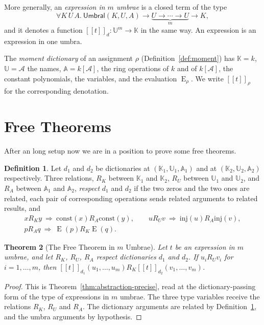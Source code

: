 \documentclass[11pt,a4paper]{report}
\theoremstyle{plain}
\newtheorem{theorem}{Theorem}[chapter]
\theoremstyle{definition}
\newtheorem{definition}[theorem]{Definition}
\theoremstyle{remark}
\newcommand{\E}{\operatorname{E}}
\newcommand{\Umbral}{\mathsf{Umbral}}
\newcommand{\sK}{\mathbb{K}}
\newcommand{\sU}{\mathbb{U}}
\newcommand{\sA}{\mathbb{A}}
\newcommand{\den}[2]{[\![#1]\!]_{#2}}
\begin{document}
More generally, an \emph{expression in $m$ umbrae} is a closed term of the type
\[
  \forall K\,U\,A.\ \Umbral(K, U, A) \to
    \underbrace{U \to \cdots \to U}_{m} \to K ,
\]
and it denotes a function $\den{t}{d} : \sU^m \to \sK$ in the same way. An
expression is an expression in one umbra.

The \emph{moment dictionary} of an assignment $\rho$
(Definition~\ref{def:moment}) has $\sK = k$, $\sU = \mathcal{A}$ the names,
$\sA = k[\mathcal{A}]$, the ring operations of $k$ and of $k[\mathcal{A}]$, the
constant polynomials, the variables, and the evaluation $\E_\rho$. We write
$\den{t}{\rho}$ for the corresponding denotation.

\section{Free Theorems}
\label{sec:free}

After an long setup now we are in a position to prove some free theorems.

\begin{definition}
\label{def:respects}
Let $d_1$ and $d_2$ be dictionaries at $(\sK_1, \sU_1, \sA_1)$ and at
$(\sK_2, \sU_2, \sA_2)$ respectively. Three relations, $R_K$ between $\sK_1$ and $\sK_2$,
$R_U$ between $\sU_1$ and $\sU_2$, and $R_A$ between $\sA_1$ and $\sA_2$, \emph{respect}
$d_1$ and $d_2$ if the two zeros and the two ones are related, each pair of
corresponding operations sends related arguments to related results, and
\begin{gather*}
  x \mathrel{R_K} y \ \Rightarrow\ \mathrm{const}(x) \mathrel{R_A} \mathrm{const}(y),
  \qquad
  u \mathrel{R_U} v \ \Rightarrow\ \mathrm{inj}(u) \mathrel{R_A} \mathrm{inj}(v),
  \\
  p \mathrel{R_A} q \ \Rightarrow\ \E(p) \mathrel{R_K} \E(q) .
\end{gather*}
\end{definition}

\begin{theorem}[The Free Theorem in $m$ Umbrae]
\label{thm:free}
Let $t$ be an expression in $m$ umbrae, and let $R_K$, $R_U$, $R_A$ respect
dictionaries $d_1$ and $d_2$. If $u_i \mathrel{R_U} v_i$ for
$i = 1, \dots, m$, then
$\den{t}{d_1}(u_1, \dots, u_m) \mathrel{R_K} \den{t}{d_2}(v_1, \dots, v_m)$.
\end{theorem}

\begin{proof}
This is Theorem~\ref{thm:abstraction-precise}, read at the dictionary-passing
form of the type of expressions in $m$ umbrae. The three type variables receive
the relations $R_K$, $R_U$ and $R_A$. The dictionary arguments are related by
Definition~\ref{def:respects}, and the umbra arguments by hypothesis.
\end{proof}
\end{document}
